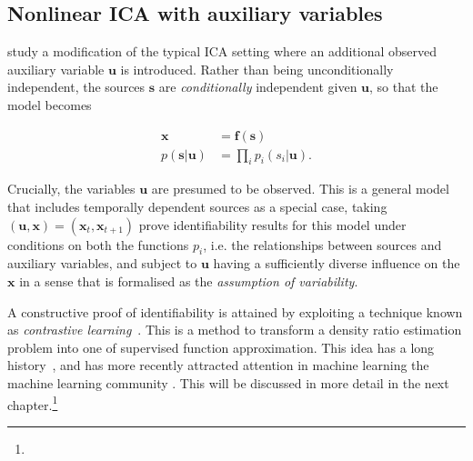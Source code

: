 





\subsection{Nonlinear ICA with auxiliary variables}\label{subsec:ica-literature-nonlinear-ica-with-aux}

\cite{hyvarinen19a} study a modification of the typical ICA setting where an additional observed auxiliary variable $\bm{u}$ is introduced.
Rather than being unconditionally independent, the sources $\bm{s}$ are \emph{conditionally} independent given $\bm{u}$, so that the model becomes

\begin{align}
\bm{x} &= \bm{f}(\bm{s}) \\
p(\bm{s}|\bm{u}) &= \prod_{i} p_i(s_i | \bm{u}).
\end{align}

Crucially, the variables $\bm{u}$ are presumed to be observed. 
This is a general model that includes temporally dependent sources as a special case, taking $(\bm{u}, \bm{x})= (\bm{x}_t,\bm{x}_{t+1})$
\cite{hyvarinen19a} prove identifiability results for this model under conditions on both the functions $p_i$, i.e. the relationships between sources and auxiliary variables, and subject to $\bm{u}$ having a sufficiently diverse influence on the $\bm{x}$ in a sense that is formalised as the \emph{assumption of variability}.


A constructive proof of identifiability is attained by exploiting a technique known as \emph{contrastive learning}~\citep{gutmann2010noise}.
This is a method to transform a density ratio estimation problem into one of supervised function approximation. This idea has a long history~\citep{friedman2001elements}, and has more recently attracted attention in machine learning the machine learning community \citep{goodfellow2014generative, gutmann2010noise}. 
This will be discussed in more detail in the next chapter.\footnote{}

